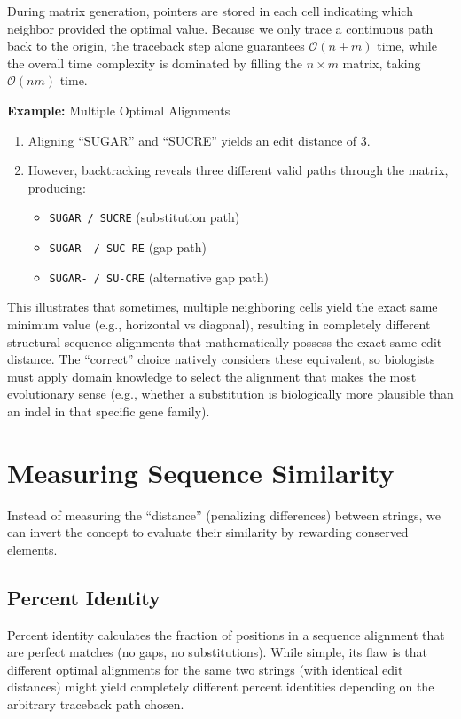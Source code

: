 \sta During matrix generation, pointers are stored in each cell indicating which neighbor provided the optimal value. Because we only trace a continuous path back to the origin, the traceback step alone guarantees \(\mathcal{O}(n+m)\) time, while the overall time complexity is dominated by filling the \(n \times m\) matrix, taking \(\mathcal{O}(nm)\) time.

\textbf{Example:}
Multiple Optimal Alignments
\begin{enumerate}
    \item Aligning ``SUGAR'' and ``SUCRE'' yields an edit distance of 3.
    \item However, backtracking reveals three different valid paths through the matrix, producing:
        \begin{itemize}
            \item \texttt{SUGAR / SUCRE} (substitution path)
            \item \texttt{SUGAR- / SUC-RE} (gap path)
            \item \texttt{SUGAR- / SU-CRE} (alternative gap path)
        \end{itemize}
\end{enumerate}
This illustrates that sometimes, multiple neighboring cells yield the exact same minimum value (e.g., horizontal vs diagonal), resulting in completely different structural sequence alignments that mathematically possess the exact same edit distance. The ``correct'' choice natively considers these equivalent, so biologists must apply domain knowledge to select the alignment that makes the most evolutionary sense (e.g., whether a substitution is biologically more plausible than an indel in that specific gene family).

\section{Measuring Sequence Similarity}

Instead of measuring the ``distance'' (penalizing differences) between strings, we can invert the concept to evaluate their similarity by rewarding conserved elements.

\subsection{Percent Identity}
Percent identity calculates the fraction of positions in a sequence alignment that are perfect matches (no gaps, no substitutions).
While simple, its flaw is that different optimal alignments for the same two strings (with identical edit distances) might yield completely different percent identities depending on the arbitrary traceback path chosen.

